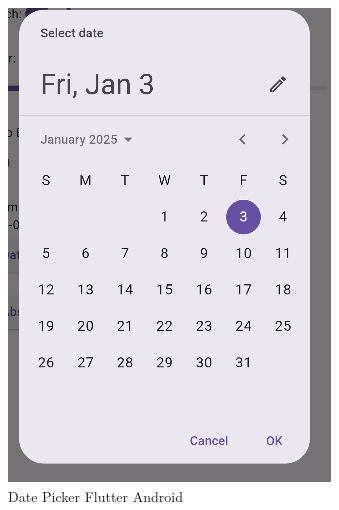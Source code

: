 \begin{figure}[H]
\begin{minipage}{0.45\textwidth}
        \includegraphics[width=\linewidth]{images/form/android/flutter/dateOpen.png}
        \caption{Date Picker Flutter Android}
    \end{minipage}

    \vspace{0.5cm}


\end{figure}
